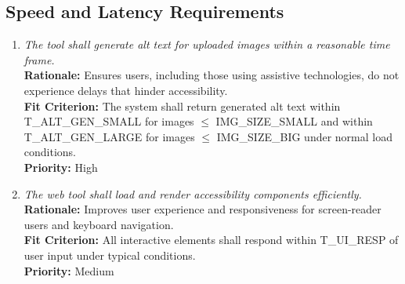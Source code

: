 \documentclass[12pt]{article}
\begin{document}
\subsection{Speed and Latency Requirements}
\begin{enumerate}[label=PR-SL \arabic*., wide=0pt, leftmargin=*]
\item \emph{The tool shall generate alt text for uploaded images within a reasonable time frame.}\\[2mm] 
    {\bf Rationale:} Ensures users, including those using assistive technologies, do not experience delays that hinder accessibility.\\
    {\bf Fit Criterion:} The system shall return generated alt text within T\_ALT\_GEN\_SMALL for images $\leq$ IMG\_SIZE\_SMALL and within T\_ALT\_GEN\_LARGE for images $\leq$ IMG\_SIZE\_BIG under normal load conditions.\\
    {\bf Priority:} High

\item \emph{The web tool shall load and render accessibility components efficiently.}\\[2mm] 
    {\bf Rationale:} Improves user experience and responsiveness for screen-reader users and keyboard navigation.\\
    {\bf Fit Criterion:} All interactive elements shall respond within T\_UI\_RESP of user input under typical conditions.\\
    {\bf Priority:} Medium
\end{enumerate}
\end{document}
